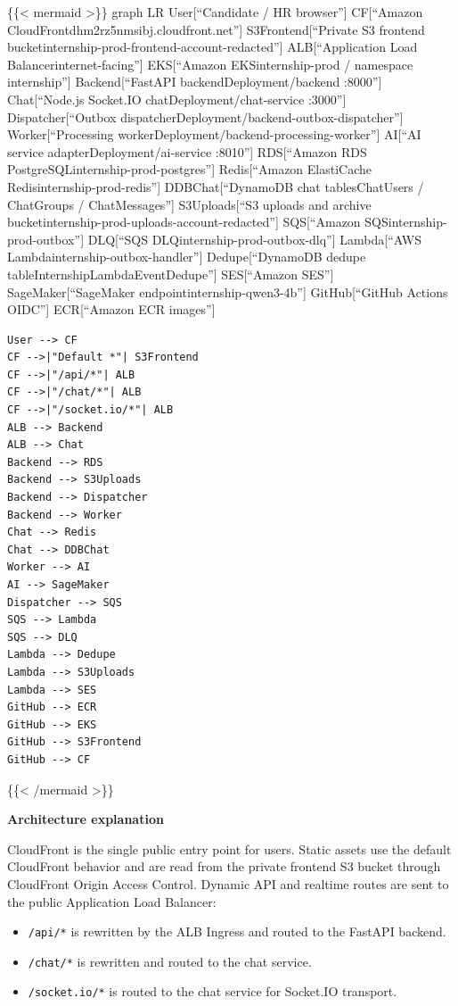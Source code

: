 \{\{\textless{} mermaid \textgreater\}\} graph LR User{[}``Candidate /
HR browser''{]} CF{[}``Amazon
CloudFrontdhm2rz5nmsibj.cloudfront.net''{]} S3Frontend{[}``Private S3
frontend bucketinternship-prod-frontend-account-redacted''{]}
ALB{[}``Application Load Balancerinternet-facing''{]} EKS{[}``Amazon
EKSinternship-prod / namespace internship''{]} Backend{[}``FastAPI
backendDeployment/backend :8000''{]} Chat{[}``Node.js Socket.IO
chatDeployment/chat-service :3000''{]} Dispatcher{[}``Outbox
dispatcherDeployment/backend-outbox-dispatcher''{]}
Worker{[}``Processing workerDeployment/backend-processing-worker''{]}
AI{[}``AI service adapterDeployment/ai-service :8010''{]} RDS{[}``Amazon
RDS PostgreSQLinternship-prod-postgres''{]} Redis{[}``Amazon ElastiCache
Redisinternship-prod-redis''{]} DDBChat{[}``DynamoDB chat
tablesChatUsers / ChatGroups / ChatMessages''{]} S3Uploads{[}``S3
uploads and archive bucketinternship-prod-uploads-account-redacted''{]}
SQS{[}``Amazon SQSinternship-prod-outbox''{]} DLQ{[}``SQS
DLQinternship-prod-outbox-dlq''{]} Lambda{[}``AWS
Lambdainternship-outbox-handler''{]} Dedupe{[}``DynamoDB dedupe
tableInternshipLambdaEventDedupe''{]} SES{[}``Amazon SES''{]}
SageMaker{[}``SageMaker endpointinternship-qwen3-4b''{]}
GitHub{[}``GitHub Actions OIDC''{]} ECR{[}``Amazon ECR images''{]}

\begin{verbatim}
User --> CF
CF -->|"Default *"| S3Frontend
CF -->|"/api/*"| ALB
CF -->|"/chat/*"| ALB
CF -->|"/socket.io/*"| ALB
ALB --> Backend
ALB --> Chat
Backend --> RDS
Backend --> S3Uploads
Backend --> Dispatcher
Backend --> Worker
Chat --> Redis
Chat --> DDBChat
Worker --> AI
AI --> SageMaker
Dispatcher --> SQS
SQS --> Lambda
SQS --> DLQ
Lambda --> Dedupe
Lambda --> S3Uploads
Lambda --> SES
GitHub --> ECR
GitHub --> EKS
GitHub --> S3Frontend
GitHub --> CF
\end{verbatim}

\{\{\textless{} /mermaid \textgreater\}\}

\vspace{0.5em}\noindent\textbf{Architecture explanation}\par

CloudFront is the single public entry point for users. Static assets use
the default CloudFront behavior and are read from the private frontend
S3 bucket through CloudFront Origin Access Control. Dynamic API and
realtime routes are sent to the public Application Load Balancer:

\begin{itemize}
\tightlist
\item
  \texttt{/\allowbreak{}api/\allowbreak{}*} is rewritten by the ALB Ingress and routed to the
  FastAPI backend.
\item
  \texttt{/\allowbreak{}chat/\allowbreak{}*} is rewritten and routed to the chat service.
\item
  \texttt{/\allowbreak{}socket.\allowbreak{}io/\allowbreak{}*} is routed to the chat service for Socket.IO
  transport.
\end{itemize}

